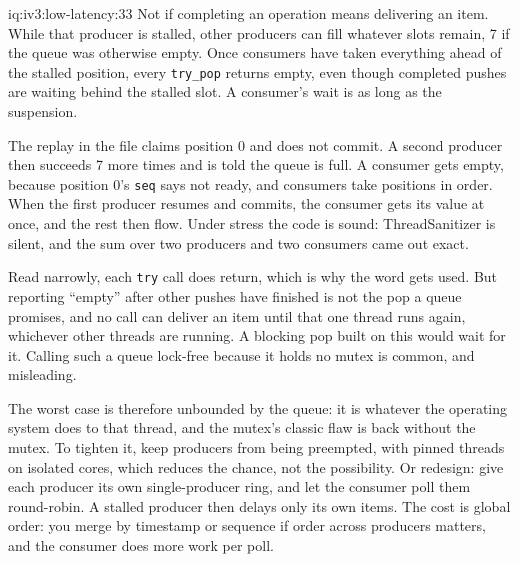 \begin{solution}{iq:iv3:low-latency:33}
Not if completing an operation means delivering an item. While that producer is stalled, other producers can fill whatever slots remain, 7 if the queue was otherwise empty. Once consumers have taken everything ahead of the stalled position, every \texttt{try\_pop} returns empty, even though completed pushes are waiting behind the stalled slot. A consumer's wait is as long as the suspension.

The replay in the file claims position 0 and does not commit. A second producer then succeeds 7 more times and is told the queue is full. A consumer gets empty, because position 0's \texttt{seq} says not ready, and consumers take positions in order. When the first producer resumes and commits, the consumer gets its value at once, and the rest then flow. Under stress the code is sound: ThreadSanitizer is silent, and the sum over two producers and two consumers came out exact.

Read narrowly, each \texttt{try} call does return, which is why the word gets used. But reporting ``empty'' after other pushes have finished is not the pop a queue promises, and no call can deliver an item until that one thread runs again, whichever other threads are running. A blocking pop built on this would wait for it. Calling such a queue lock-free because it holds no mutex is common, and misleading.

The worst case is therefore unbounded by the queue: it is whatever the operating system does to that thread, and the mutex's classic flaw is back without the mutex. To tighten it, keep producers from being preempted, with pinned threads on isolated cores, which reduces the chance, not the possibility. Or redesign: give each producer its own single-producer ring, and let the consumer poll them round-robin. A stalled producer then delays only its own items. The cost is global order: you merge by timestamp or sequence if order across producers matters, and the consumer does more work per poll.

\end{solution}

